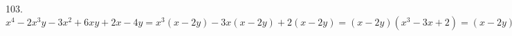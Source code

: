 103. $x^4-2x^3y-3x^2+6xy+2x-4y=x^3(x-2y)-3x(x-2y)+2(x-2y)=(x-2y)(x^3-3x+2)=
(x-2y)(x(x^2-1)-2(x-1))=(x-2y)(x(x-1)(x+1)-2(x-1))=
(x-2y)(x-1)(x^2+x-2)=(x-2y)(x-1)^2(x+2).$\\

